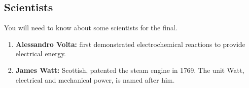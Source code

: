 \subsection*{Scientists}
You will need to know about some scientists for the final.

\begin{enumerate}
  \item \textbf{Alessandro Volta:} first demonstrated electrochemical
  reactions to provide electrical energy.
  \item \textbf{James Watt:} Scottish, patented the steam engine in 1769.
  The unit Watt, electrical and mechanical power, is named after him.
\end{enumerate}